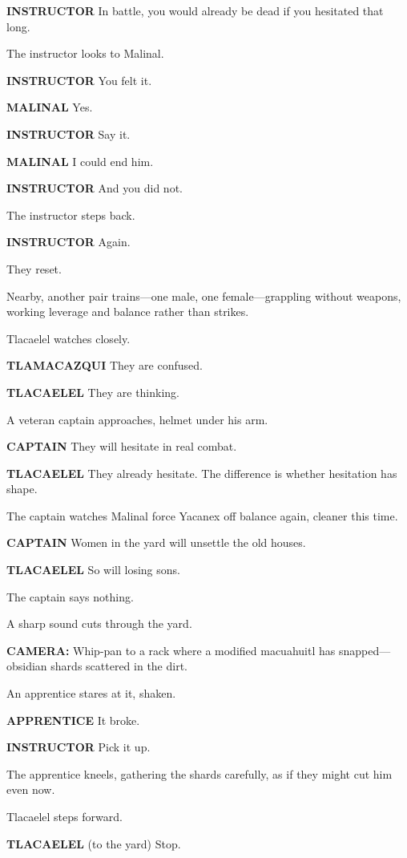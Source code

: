 \documentclass[12pt]{article}
\begin{document}
\textbf{INSTRUCTOR}  
In battle, you would already be dead  
if you hesitated that long.

The instructor looks to Malinal.

\textbf{INSTRUCTOR}  
You felt it.

\textbf{MALINAL}  
Yes.

\textbf{INSTRUCTOR}  
Say it.

\textbf{MALINAL}  
I could end him.

\textbf{INSTRUCTOR}  
And you did not.

The instructor steps back.

\textbf{INSTRUCTOR}  
Again.

They reset.

Nearby, another pair trains—one male, one female—grappling without weapons, working leverage and balance rather than strikes.

Tlacaelel watches closely.

\textbf{TLAMACAZQUI}  
They are confused.

\textbf{TLACAELEL}  
They are thinking.

A veteran captain approaches, helmet under his arm.

\textbf{CAPTAIN}  
They will hesitate in real combat.

\textbf{TLACAELEL}  
They already hesitate.  
The difference is whether hesitation has shape.

The captain watches Malinal force Yacanex off balance again, cleaner this time.

\textbf{CAPTAIN}  
Women in the yard will unsettle the old houses.

\textbf{TLACAELEL}  
So will losing sons.

The captain says nothing.

A sharp sound cuts through the yard.

\textbf{CAMERA:} Whip-pan to a rack where a modified macuahuitl has snapped—obsidian shards scattered in the dirt.

An apprentice stares at it, shaken.

\textbf{APPRENTICE}  
It broke.

\textbf{INSTRUCTOR}  
Pick it up.

The apprentice kneels, gathering the shards carefully, as if they might cut him even now.

Tlacaelel steps forward.

\textbf{TLACAELEL}  
(to the yard)  
Stop.
\end{document}
